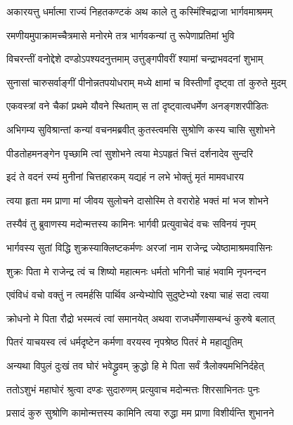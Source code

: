 \twolineshloka
{अकारयत्तु धर्मात्मा राज्यं निहतकण्टकं}
{अथ काले तु कस्मिंश्चिद्राजा भार्गवमाश्रमम्}%

\twolineshloka
{रमणीयमुपाक्रामच्चैत्रमासे मनोरमे}
{तत्र भार्गवकन्यां तु रूपेणाप्रतिमां भुवि}%

\twolineshloka
{विचरन्तीं वनोद्देशे दण्डोऽपश्यदनुत्तमाम्}
{उत्तुङ्गपीवरीं श्यामां चन्द्राभवदनां शुभाम्}%

\twolineshloka
{सुनासां चारुसर्वाङ्गीं पीनोन्नतपयोधराम्}
{मध्ये क्षामां च विस्तीर्णां दृष्ट्वा तां कुरुते मुदम्}%

\twolineshloka
{एकवस्त्रां वने चैकां प्रथमे यौवने स्थिताम्}
{स तां दृष्ट्वात्वधर्मेण अनङ्गशरपीडितः}%

\twolineshloka
{अभिगम्य सुविश्रान्तां कन्यां वचनमब्रवीत्}
{कुतस्त्वमसि सुश्रोणि कस्य चासि सुशोभने}%

\twolineshloka
{पीडतोहमनङ्गेन पृच्छामि त्वां सुशोभने}
{त्वया मेऽपहृतं चित्तं दर्शनादेव सुन्दरि}%

\twolineshloka
{इदं ते वदनं रम्यं मुनीनां चित्तहारकम्}
{यद्यहं न लभे भोक्तुं मृतं मामवधारय}%

\twolineshloka
{त्वया हृता मम प्राणा मां जीवय सुलोचने}
{दासोस्मि ते वरारोहे भक्तं मां भज शोभने}%

\twolineshloka
{तस्यैवं तु ब्रुवाणस्य मदोन्मत्तस्य कामिनः}
{भार्गवी प्रत्युवाचेदं वचः सविनयं नृपम्}%

\twolineshloka
{भार्गवस्य सुतां विद्धि शुक्रस्याक्लिष्टकर्मणः}
{अरजां नाम राजेन्द्र ज्येष्ठामाश्रमवासिनः}%

\twolineshloka
{शुक्रः पिता मे राजेन्द्र त्वं च शिष्यो महात्मनः}
{धर्मतो भगिनी चाहं भवामि नृपनन्दन}%

\twolineshloka
{एवंविधं वचो वक्तुं न त्वमर्हसि पार्थिव}
{अन्येभ्योपि सुदुष्टेभ्यो रक्ष्या चाहं सदा त्वया}%

\twolineshloka
{क्रोधनो मे पिता रौद्रो भस्मत्वं त्वां समानयेत्}
{अथवा राजधर्मेणासम्बन्धं कुरुषे बलात्}%

\twolineshloka
{पितरं याचयस्व त्वं धर्मदृष्टेन कर्मणा}
{वरयस्व नृपश्रेष्ठ पितरं मे महाद्युतिम्}%

\twolineshloka
{अन्यथा विपुलं दुःखं तव घोरं भवेद्ध्रुवम्}
{क्रुद्धो हि मे पिता सर्वं त्रैलोक्यमभिनिर्दहेत्}%

\twolineshloka
{ततोऽशुभं महाघोरं श्रुत्वा दण्डः सुदारुणम्}
{प्रत्युवाच मदोन्मत्तः शिरसाभिनतः पुनः}%

\twolineshloka
{प्रसादं कुरु सुश्रोणि कामोन्मत्तस्य कामिनि}
{त्वया रुद्धा मम प्राणा विशीर्यन्ति शुभानने}%

